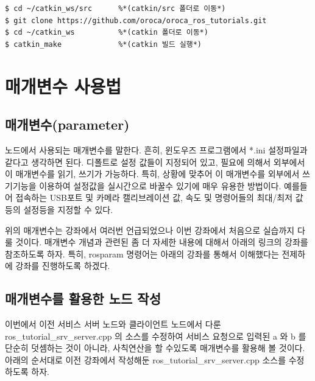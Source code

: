 \begin{lstlisting}[language=ROS]
$ cd ~/catkin_ws/src      %*(catkin/src 폴더로 이동*)
$ git clone https://github.com/oroca/oroca_ros_tutorials.git
$ cd ~/catkin_ws          %*(catkin 폴더로 이동*)
$ catkin_make             %*(catkin 빌드 실행*)
\end{lstlisting}

\section{매개변수 사용법}

\subsection{매개변수(parameter)}

\begin{definition*}\label{def:RosParameter}
노드에서 사용되는 매개변수를 말한다. 흔히, 윈도우즈 프로그램에서 *.ini 설정파일과 같다고 생각하면 된다. 디폴트로 설정 값들이 지정되어 있고, 필요에 의해서 외부에서 이 매개변수를 읽기, 쓰기가 가능하다. 특히, 상황에 맞추어 이 매개변수를 외부에서 쓰기기능을 이용하여 설정값을 실시간으로 바꿀수 있기에 매우 유용한 방법이다. 예를들어 접속하는 USB포트 및 카메라 캘리브레이션 값, 속도 및 명령어들의 최대/최저 값 등의 설정등을 지정할 수 있다.
\end{definition*}

위의 매개변수는 강좌에서 여러번 언급되었으나 이번 강좌에서 처음으로 실습까지 다룰 것이다. 매개변수 개념과 관련된 좀 더 자세한 내용에 대해서 아래의 링크의 강좌를 참조하도록 하자. 특히, rosparam 명령어는 아래의 강좌를 통해서 이해했다는 전제하에 강좌를 진행하도록 하겠다.

\subsection{매개변수를 활용한 노드 작성}

이번에서 이전 서비스 서버 노드와 클라이언트 노드에서 다룬 ros\_tutorial\_srv\_server.cpp 의 소스를 수정하여 서비스 요청으로 입력된 a 와 b 를 단순히 덧셈하는 것이 아니라, 사칙연산을 할 수있도록 매개변수를 활용해 볼 것이다. 아래의 순서대로 이전 강좌에서 작성해둔 ros\_tutorial\_srv\_server.cpp 소스를 수정하도록 하자.

